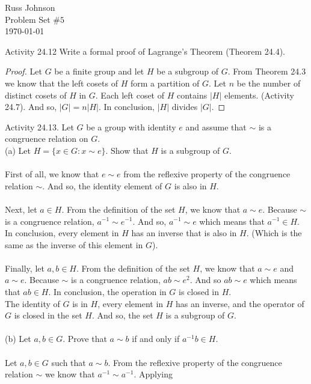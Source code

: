 \documentclass[11pt,a4paper]{article}
\begin{document}
\begin{flushright}
Russ Johnson\\
Problem Set $\#5$\\
\today\\
\end{flushright}

Activity 24.12 Write a formal proof of Lagrange's Theorem (Theorem 24.4).\\
\begin{proof}
Let $G$ be a finite group and let $H$ be a subgroup of $G$. From Theorem 24.3 we know that the left cosets of $H$ form a partition of $G$. Let $n$ be the number of distinct cosets of $H$ in $G$. Each left coset of $H$ contains $|H|$ elements. (Activity 24.7). And so, $|G| = n|H|$. In conclusion, $|H|$ divides $|G|$.
\end{proof}
Activity 24.13. Let $G$ be a group with identity $e$ and assume that $\sim$ is a congruence relation on $G$.\\
(a) Let $H = \{x \in G : x \sim e\}$. Show that $H$ is a subgroup of $G$.\\
~\\
First of all, we know that $e\sim e$ from the reflexive property of the congruence relation $\sim$. And so, the identity element of $G$ is also in $H$.\\
~\\
Next, let $a\in H$. From the definition of the set $H$, we know that $a\sim e$. Because $\sim$ is a congruence relation,  $a^{-1} \sim e^{-1} $. And so, $a^{-1} \sim e$ which means that $a^{-1}\in H$. In conclusion, every element in $H$ has an inverse that is also in $H$. (Which is the same as the inverse of this element in $G$).\\
~\\
Finally, let $a,b\in H$. From the definition of the set $H$, we know that $a\sim e$ and $a\sim e$. Because $\sim$ is a congruence relation,  $ab \sim e^2 $. And so $ab \sim e$ which means that $ab\in H$. In conclusion, the operation in $G$ is closed in $H$.
~\\
The identity of $G$ is in $H$, every element in $H$ has an inverse, and the operator of $G$ is closed in the set $H$. And so, the set $H$ is a subgroup of $G$.\\
~\\
(b) Let $a, b \in G$. Prove that $a \sim b$ if and only if $a^{-1} b \in H$.\\
~\\
Let $a,b\in G$ such that $a\sim b$. From the reflexive property of the congruence relation $\sim$ we know that $a ^{-1}\sim a^{-1}$. Applying 
\end{document}
